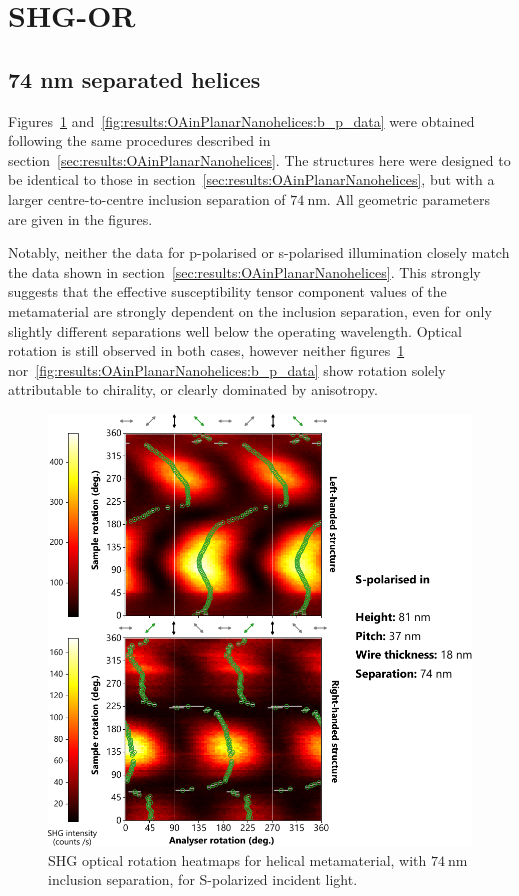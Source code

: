 \section{SHG-OR}\label{sec:appendix:AdditionalHelixOR}

\subsection{74 nm separated helices}
Figures~\ref{fig:results:OAinPlanarNanohelices:b_s_data} and~\ref{fig:results:OAinPlanarNanohelices:b_p_data} were obtained following the same procedures described in section~\ref{sec:results:OAinPlanarNanohelices}. The structures here were designed to be identical to those in section~\ref{sec:results:OAinPlanarNanohelices}, but with a larger centre-to-centre inclusion separation of $\SI{74}{\nano\m}$. All geometric parameters are given in the  figures.

Notably, neither the data for p-polarised or s-polarised illumination closely match the data shown in section~\ref{sec:results:OAinPlanarNanohelices}. This strongly suggests that the effective susceptibility tensor component values of the metamaterial are strongly dependent on the inclusion separation, even for only slightly different separations well below the operating wavelength. Optical rotation is still observed in both cases, however neither figures~\ref{fig:results:OAinPlanarNanohelices:b_s_data} nor~\ref{fig:results:OAinPlanarNanohelices:b_p_data} show rotation solely attributable to chirality, or clearly dominated by anisotropy.
\begin{figure}[htb!]	
    \centering	
    \includegraphics[scale=1]{./figures/results/OAinPlanarNanohelices/b_s_data.pdf}
    \caption{\label{fig:results:OAinPlanarNanohelices:b_s_data}
    SHG optical rotation heatmaps for helical metamaterial, with $\SI{74}{\nano\m}$ inclusion separation, for S-polarized incident light.}	
\end{figure}

